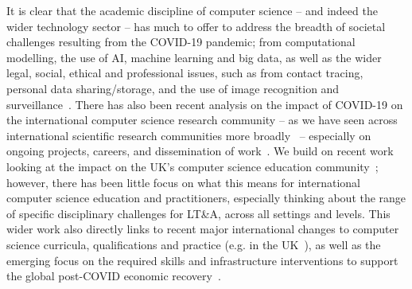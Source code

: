 \documentclass[conference]{IEEEtran}
\begin{document}



It is clear that the academic discipline of computer science -- and
indeed the wider technology sector -- has much to offer to address the
breadth of societal challenges resulting from the COVID-19 pandemic;
from computational modelling, the use of AI, machine learning and big
data, as well as the wider legal, social, ethical and professional
issues, such as from contact tracing, personal data sharing/storage,
and the use of image recognition and
surveillance~\cite{dwivedi-et-al:ijim2019,ting-et-al:2020,cerf:2020,chun-et-al:2020,rcjbbcnews:2020}. There
has also been recent analysis on the impact of COVID-19 on the
international computer science research community -- as we have seen
across international scientific research communities more
broadly~\cite{oecdcovid19:2020} -- especially on ongoing projects,
careers, and dissemination of work~\cite{msrcovid19:2020}. We build on
recent work looking at the impact on the UK's computer science
education community~\cite{crick-et-al:ukicer2020}; however, there has
been little focus on what this means for international computer
science education and practitioners, especially thinking about the
range of specific disciplinary challenges for LT\&A, across all
settings and levels. This wider work also directly links to recent
major international changes to computer science curricula,
qualifications and practice (e.g. in the
UK~\cite{brown-et-al-sigcse2013,brown-et-al-toce2014}), as well as the
emerging focus on the required skills and infrastructure interventions
to support the global post-COVID economic
recovery~\cite{davenport-et-al:educon2020,euparl:2020,mckinsey:2020}.


\end{document}
